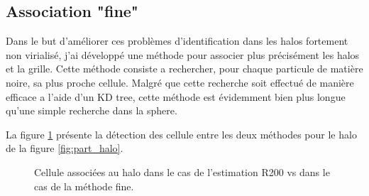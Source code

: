 \subsection{Association "fine"}

Dans le but d'améliorer ces problèmes d'identification dans les halos fortement non virialisé, j'ai développé une méthode pour associer plus précisément les halos et la grille.
Cette méthode consiste a rechercher, pour chaque particule de matière noire, sa plus proche cellule.
Malgré que cette recherche soit effectué de manière efficace a l'aide d'un KD tree, cette méthode est évidemment bien plus longue qu'une simple recherche dans la sphere.


La figure \ref{fig:R200_fine} présente la détection des cellule entre les deux méthodes pour le halo de la figure \ref{fig:part_halo}.


\begin{figure}[bth]
        \caption{Cellule associées au halo dans le cas de l'estimation R200 vs dans le cas de la méthode fine.
        }
 		\label{fig:R200_fine}
\end{figure}




